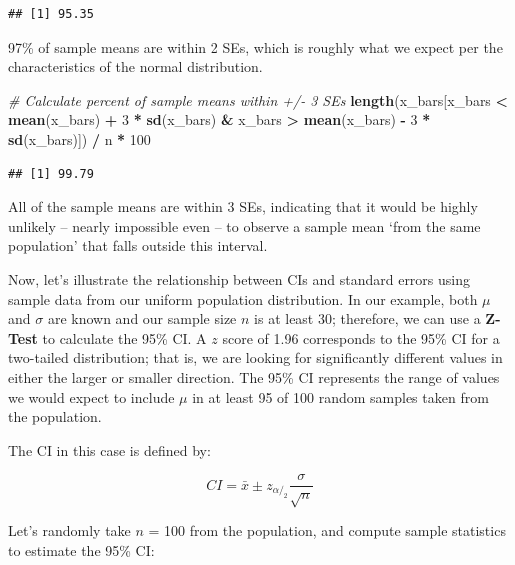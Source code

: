 \documentclass[]{book}
\newenvironment{Shaded}{\begin{snugshade}}{\end{snugshade}}
\newcommand{\CommentTok}[1]{\textcolor[rgb]{0.56,0.35,0.01}{\textit{#1}}}
\newcommand{\DecValTok}[1]{\textcolor[rgb]{0.00,0.00,0.81}{#1}}
\newcommand{\KeywordTok}[1]{\textcolor[rgb]{0.13,0.29,0.53}{\textbf{#1}}}
\newcommand{\NormalTok}[1]{#1}
\newcommand{\OperatorTok}[1]{\textcolor[rgb]{0.81,0.36,0.00}{\textbf{#1}}}
\newcommand{\StringTok}[1]{\textcolor[rgb]{0.31,0.60,0.02}{#1}}
\begin{document}
\begin{verbatim}
## [1] 95.35
\end{verbatim}

97\% of sample means are within 2 SEs, which is roughly what we expect per the characteristics of the normal distribution.

\begin{Shaded}
\begin{Highlighting}[]
\CommentTok{# Calculate percent of sample means within +/- 3 SEs}
\KeywordTok{length}\NormalTok{(x_bars[x_bars }\OperatorTok{<}\StringTok{ }\KeywordTok{mean}\NormalTok{(x_bars) }\OperatorTok{+}\StringTok{ }\DecValTok{3} \OperatorTok{*}\StringTok{ }\KeywordTok{sd}\NormalTok{(x_bars) }\OperatorTok{&}\StringTok{ }\NormalTok{x_bars }\OperatorTok{>}\StringTok{ }\KeywordTok{mean}\NormalTok{(x_bars) }\OperatorTok{-}\StringTok{ }\DecValTok{3} \OperatorTok{*}\StringTok{ }\KeywordTok{sd}\NormalTok{(x_bars)]) }\OperatorTok{/}\StringTok{ }\NormalTok{n }\OperatorTok{*}\StringTok{ }\DecValTok{100}
\end{Highlighting}
\end{Shaded}

\begin{verbatim}
## [1] 99.79
\end{verbatim}

All of the sample means are within 3 SEs, indicating that it would be highly unlikely -- nearly impossible even -- to observe a sample mean `from the same population' that falls outside this interval.

Now, let's illustrate the relationship between CIs and standard errors using sample data from our uniform population distribution. In our example, both \(\mu\) and \(\sigma\) are known and our sample size \(n\) is at least 30; therefore, we can use a \textbf{Z-Test} to calculate the 95\% CI. A \(z\) score of 1.96 corresponds to the 95\% CI for a two-tailed distribution; that is, we are looking for significantly different values in either the larger or smaller direction. The 95\% CI represents the range of values we would expect to include \(\mu\) in at least 95 of 100 random samples taken from the population.

The CI in this case is defined by:

\[ CI = \bar{x} \pm z_{\alpha/_2} \frac{\sigma}{\sqrt{n}} \]

Let's randomly take \(n\) = 100 from the population, and compute sample statistics to estimate the 95\% CI:
\end{document}
